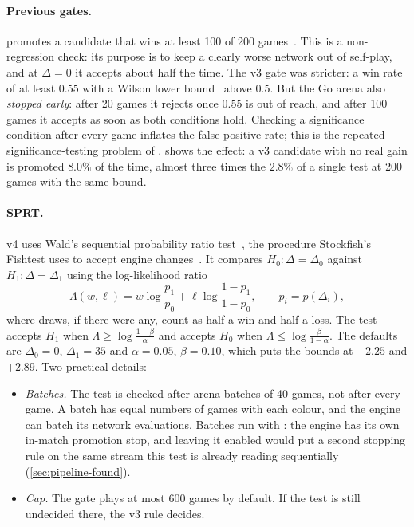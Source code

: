 \paragraph{Previous gates.}
\katago{} promotes a candidate that wins at least 100 of 200
games~\citep[App.~E]{wu2019accelerating}. This is a non-regression check: its purpose is to
keep a clearly worse network out of self-play, and at $\Delta=0$ it accepts about half the
time. The v3 gate was stricter: a win rate of at least $0.55$ with a Wilson lower
bound~\citep{wilson1927probable} above $0.5$. But the Go arena also \emph{stopped early}:
after 20 games it rejects once $0.55$ is out of reach, and after 100 games it accepts as
soon as both conditions hold. Checking a significance condition after every game inflates
the false-positive rate; this is the repeated-significance-testing problem of
\citet{armitage1969repeated}.  shows the effect: a v3 candidate with
no real gain is promoted $8.0\%$ of the time, almost three times the $2.8\%$ of a single
test at 200 games with the same bound.

\paragraph{SPRT.}
v4 uses Wald's sequential probability ratio test~\citep{wald1945sequential}, the procedure
Stockfish's Fishtest uses to accept engine changes~\citep{fishtest}. It compares
$H_0\colon \Delta=\Delta_0$ against $H_1\colon \Delta=\Delta_1$ using the log-likelihood
ratio
\begin{equation}
  \Lambda(w,\ell) = w \log\frac{p_1}{p_0} + \ell \log\frac{1-p_1}{1-p_0},
  \qquad p_i = p(\Delta_i),
  \label{eq:llr}
\end{equation}
where draws, if there were any, count as half a win and half a loss. The test accepts
$H_1$ when $\Lambda \ge \log\frac{1-\beta}{\alpha}$ and accepts $H_0$ when
$\Lambda \le \log\frac{\beta}{1-\alpha}$. The defaults are $\Delta_0=0$, $\Delta_1=35$ and
$\alpha=0.05$, $\beta=0.10$, which puts the bounds at $-2.25$ and $+2.89$. Two
practical details:
\begin{itemize}
  \item \emph{Batches.} The test is checked after arena batches of 40 games, not after
        every game. A batch has equal numbers of games with each colour, and the engine can
        batch its network evaluations. Batches run with : the engine
        has its own in-match promotion stop, and leaving it enabled would put a second
        stopping rule on the same stream this test is already reading sequentially
        (\cref{sec:pipeline-found}).
  \item \emph{Cap.} The gate plays at most 600 games by default. If the test is still undecided
        there, the v3 rule decides.
\end{itemize}

